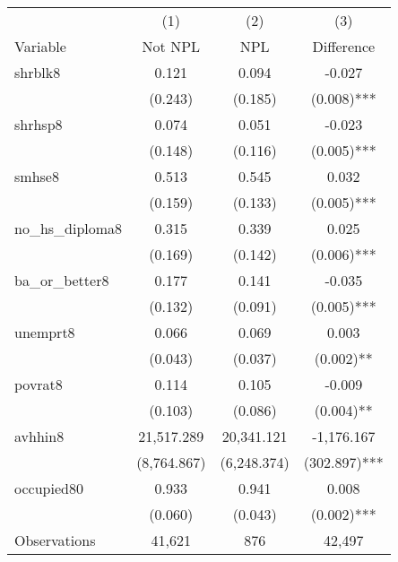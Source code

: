 \begin{tabular}{lccc}
\hline\hline
 & (1) & (2) & (3)   \\
Variable & Not NPL & NPL & Difference   \\
\hline
shrblk8&0.121&0.094&-0.027\\
&(0.243)&(0.185)&(0.008)***\\
shrhsp8&0.074&0.051&-0.023\\
&(0.148)&(0.116)&(0.005)***\\
smhse8&0.513&0.545&0.032\\
&(0.159)&(0.133)&(0.005)***\\
no\_hs\_diploma8&0.315&0.339&0.025\\
&(0.169)&(0.142)&(0.006)***\\
ba\_or\_better8&0.177&0.141&-0.035\\
&(0.132)&(0.091)&(0.005)***\\
unemprt8&0.066&0.069&0.003\\
&(0.043)&(0.037)&(0.002)**\\
povrat8&0.114&0.105&-0.009\\
&(0.103)&(0.086)&(0.004)**\\
avhhin8&21,517.289&20,341.121&-1,176.167\\
&(8,764.867)&(6,248.374)&(302.897)***\\
occupied80&0.933&0.941&0.008\\
&(0.060)&(0.043)&(0.002)***\\
\hline
Observations & 41,621 & 876 & 42,497  \\
\hline\hline
\end{tabular}

